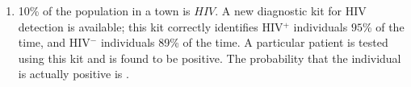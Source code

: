 \documentclass[journal,12pt,onecolumn]{IEEEtran}
\theoremstyle{remark}
\begin{document}
\begin{enumerate}
\hfill{}
  \begin{multicols}{4}
  \begin{enumerate}
    \item $1$
    \item $\sqrt{2}$
    \item $\sqrt{3}$
    \item $2$
\end{enumerate}
 \end{multicols}
\item 10\% of the population in a town is $HIV$. A new diagnostic kit for HIV detection is available; this kit correctly identifies HIV$^+$ individuals $95$\% of the time, and HIV$^-$ individuals 89\% of the time. A particular patient is tested using this kit and is found to be positive. The probability that the individual is actually positive is \underline{\hspace{2cm}}.
\end{enumerate}

\hfill{}
\end{document}
